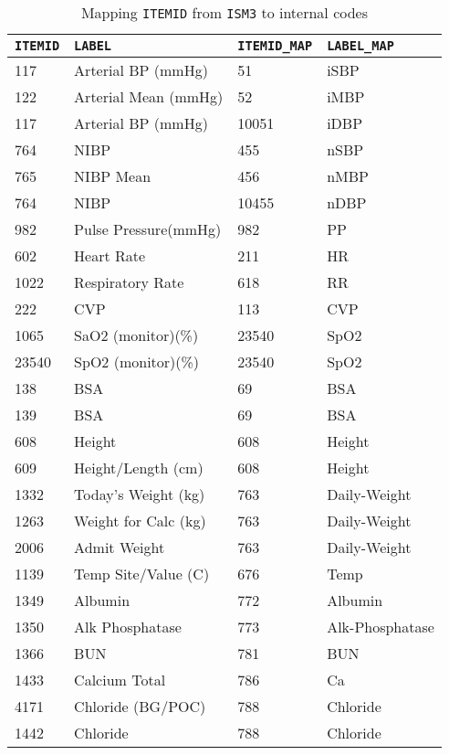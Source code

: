 \documentclass[
   technote
]{phildoc}
\begin{document}
\begin{table}[h!]
\center
\caption{Mapping \texttt{ITEMID} from \texttt{ISM3} to internal codes}
\label{code_mapping}
\begin{tabular}{l|l|l|l}
	\hline
	\verb|ITEMID| & \verb|LABEL| & \verb|ITEMID_MAP| & \verb|LABEL_MAP| \\
	\hline
	\hline
	117	& Arterial BP (mmHg) & 51 &	iSBP \\
	\hline
	122	& Arterial Mean (mmHg)	& 52 &	iMBP \\
	\hline
	117	& Arterial BP (mmHg) & 10051 & iDBP \\
	\hline
	764	& NIBP & 455 & nSBP \\
	\hline
	765	& NIBP Mean & 456 &	nMBP \\
	\hline
	764	& NIBP	& 10455 & nDBP \\
	\hline
	982 & Pulse Pressure(mmHg) & 982 & PP \\
	\hline
	602 & Heart Rate & 211 & HR \\
	\hline
	1022 & Respiratory Rate & 618 & RR \\
	\hline
	222 & CVP & 113 & CVP \\
	\hline
	1065 &	SaO2 (monitor)(\%) & 23540 & SpO2 \\
	\hline
	23540 &	SpO2 (monitor)(\%)	& 23540 & SpO2 \\
	\hline
	138 & BSA & 69 & BSA \\
	\hline
	139	& BSA & 69 & BSA \\
	\hline
	608 & Height & 608 & Height \\
	\hline
	609	& Height/Length (cm) & 608 & Height \\
	\hline
	1332 & Today's Weight (kg) & 763 & Daily-Weight \\
	\hline
	1263 & Weight for Calc (kg) & 763 & Daily-Weight \\
	\hline
	2006 & Admit Weight & 763 & Daily-Weight \\
	\hline
	1139 & Temp Site/Value (C) & 676 & Temp \\
	\hline
	1349 & Albumin & 772 & Albumin \\
	\hline
	1350 & Alk Phosphatase & 773 & Alk-Phosphatase \\
	\hline
	1366 & BUN & 781 & BUN \\
	\hline
	1433 & Calcium Total & 786 & Ca \\
	\hline
	4171 & Chloride (BG/POC) & 788 & Chloride \\
	\hline
	1442 & Chloride & 788 & Chloride \\

\end{tabular}
\end{table}
\end{document}
